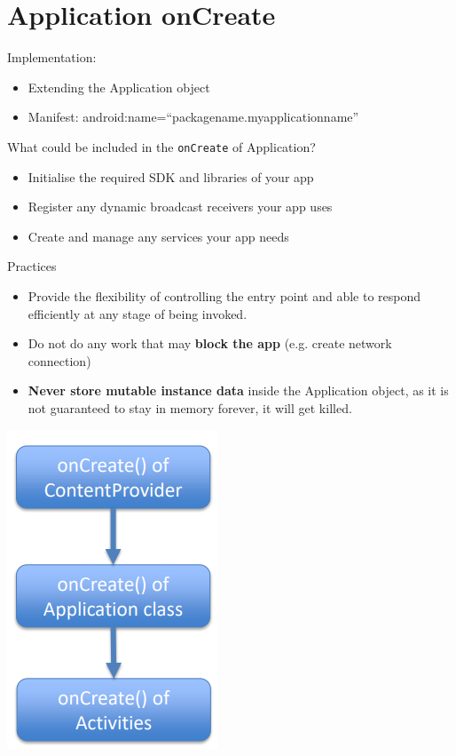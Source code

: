 \documentclass{article}
\begin{document}
\tableofcontents

\newpage

\section{Application onCreate}

\begin{multicols}{2}
Implementation:
\begin{itemize}
  \item Extending the Application object
  \item Manifest: android:name=“packagename.myapplicationname” 
\end{itemize}
What could be included in the \texttt{onCreate} of Application?
\begin{itemize}
  \item Initialise the required SDK and libraries of your app
  \item Register any dynamic broadcast receivers your app uses
  \item Create and manage any services your app needs 
\end{itemize}
Practices
\begin{itemize}
  \item Provide the flexibility of controlling the entry point and able to respond efficiently at any stage of being invoked.
  \item Do not do any work that may \textbf{block the app} (e.g. create network connection)
  \item \textbf{Never store mutable instance data} inside the Application object, as it is not guaranteed to stay in memory forever, it will get killed.
\end{itemize}

\vfill\null

\includegraphics[scale=0.6]{app_oncreate.png}

\end{multicols}
\end{document}
